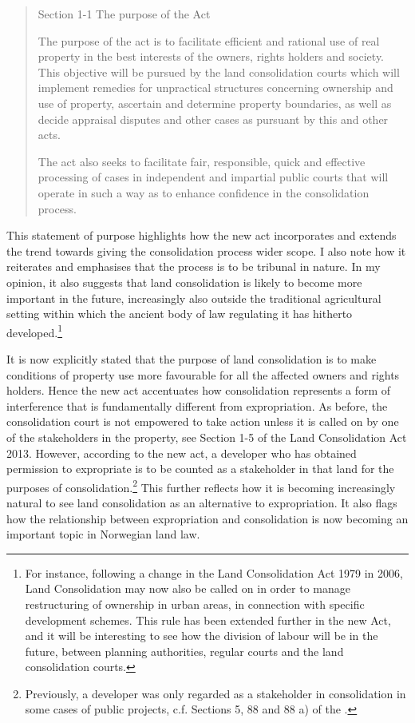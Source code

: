 \begin{quote}
Section 1-1 The purpose of the Act

The purpose of the act is to facilitate efficient and rational use of real property in the best interests of the owners, rights holders and society. This objective will be pursued by the land consolidation courts which will implement remedies for unpractical structures concerning ownership and use of property, ascertain and determine property boundaries, as well as decide appraisal disputes and other cases as pursuant by this and other acts.

The act also seeks to facilitate fair, responsible, quick and effective processing of cases in independent and impartial public courts that will operate in such a way as to enhance confidence in the consolidation process.
\end{quote}

This statement of purpose highlights how the new act incorporates and extends the trend towards giving the consolidation process wider scope. I also note how it reiterates and emphasises that the process is to be tribunal in nature. In my opinion, it also suggests that land consolidation is likely to become more important in the future, increasingly also outside the traditional agricultural setting within which the ancient body of law regulating it has hitherto developed.\footnote{For instance, following a change in the Land Consolidation Act 1979 in 2006, Land Consolidation may now also be called on in order to manage restructuring of ownership in urban areas, in connection with specific development schemes. This rule has been extended further in the new Act, and it will be interesting to see how the division of labour will be in the future, between planning authorities, regular courts and the land consolidation courts.}

It is now explicitly stated that the purpose of land consolidation is to make conditions of property use more favourable for all the affected owners and rights holders. Hence the new act accentuates how consolidation represents a form of interference that is fundamentally different from expropriation. As before, the consolidation court is not empowered to take action unless it is called on by one of the stakeholders in the property, see Section 1-5 of the Land Consolidation Act 2013. However, according to the new act, a developer who has obtained permission to expropriate is to be counted as a stakeholder in that land for the purposes of consolidation.\footnote{Previously, a developer was only regarded as a stakeholder in consolidation in some cases of public projects, c.f. Sections 5, 88 and 88 a) of the \cite{lca79}.} This further reflects how it is becoming increasingly natural to see land consolidation as an alternative to expropriation. It also flags how the relationship between expropriation and consolidation is now becoming an important topic in Norwegian land law.

